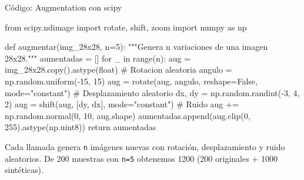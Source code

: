 \documentclass[aspectratio=169, 11pt]{beamer}
\begin{document}
\begin{frame}[fragile,shrink=22]{C\'odigo: Augmentation con scipy}
  \vspace{-6pt}
  \begin{pyblock}
from scipy.ndimage import rotate, shift, zoom
import numpy as np

def augmentar(img_28x28, n=5):
    """Genera n variaciones de una imagen 28x28."""
    aumentadas = []
    for _ in range(n):
        aug = img_28x28.copy().astype(float)
        # Rotacion aleatoria
        angulo = np.random.uniform(-15, 15)
        aug = rotate(aug, angulo, reshape=False, mode="constant")
        # Desplazamiento aleatorio
        dx, dy = np.random.randint(-3, 4, 2)
        aug = shift(aug, [dy, dx], mode="constant")
        # Ruido
        aug += np.random.normal(0, 10, aug.shape)
        aumentadas.append(aug.clip(0, 255).astype(np.uint8))
    return aumentadas
  \end{pyblock}

  \vspace{4pt}
  {\scriptsize\color{arcaDark}
    \faKey\hspace{4pt} Cada llamada genera \texttt{n} im\'agenes nuevas
    con rotaci\'on, desplazamiento y ruido aleatorios. De 200 muestras
    con \texttt{n=5} obtenemos 1200 (200 originales + 1000 sint\'eticas).}
\end{frame}
\end{document}
